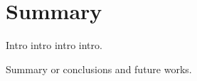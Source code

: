 \chapter{Summary}
\begin{chapabstract}

Intro intro intro intro.

\end{chapabstract}

Summary or conclusions and future works.
